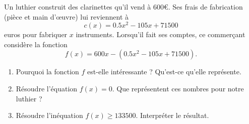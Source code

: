 
\begin{exercice}\label{exosmath-0557}

    Un luthier construit des clarinettes qu'il vend à \( 600\)€.  Ses frais de fabrication (pièce et main d'œuvre) lui reviennent à
    \begin{equation*}
        c(x)=0.5x^2-105x+71500
    \end{equation*}
    euros pour fabriquer \( x\) instruments. Lorsqu'il fait ses comptes, ce commerçant considère la fonction
    \begin{equation*}
        f(x)=600x-(0.5x^2-105x+71500).
    \end{equation*}
    \begin{enumerate}
        \item
            Pourquoi la fonction \( f\) est-elle intéressante ? Qu'est-ce qu'elle représente.
        \item
            Résoudre l'équation \( f(x)=0\). Que représentent ces nombres pour notre luthier ?
        \item
            Résoudre l'inéquation \( f(x)\geq 133500\). Interpréter le résultat.
    \end{enumerate}

\end{exercice}
